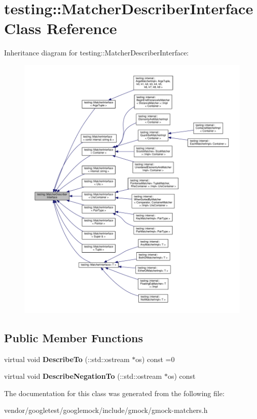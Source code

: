 \hypertarget{classtesting_1_1MatcherDescriberInterface}{}\section{testing\+:\+:Matcher\+Describer\+Interface Class Reference}
\label{classtesting_1_1MatcherDescriberInterface}


Inheritance diagram for testing\+:\+:Matcher\+Describer\+Interface\+:\nopagebreak
\begin{figure}[H]
\begin{center}
\leavevmode
\includegraphics[width=350pt]{classtesting_1_1MatcherDescriberInterface__inherit__graph}
\end{center}
\end{figure}
\subsection*{Public Member Functions}
\begin{DoxyCompactItemize}
\item 
virtual void {\bfseries Describe\+To} (\+::std\+::ostream $\ast$os) const =0\hypertarget{classtesting_1_1MatcherDescriberInterface_ad9f861588bd969b6e3e717f13bb94e7b}{}\label{classtesting_1_1MatcherDescriberInterface_ad9f861588bd969b6e3e717f13bb94e7b}

\item 
virtual void {\bfseries Describe\+Negation\+To} (\+::std\+::ostream $\ast$os) const \hypertarget{classtesting_1_1MatcherDescriberInterface_a35b9dc2f3e25ca4b903f282feaaf9f8c}{}\label{classtesting_1_1MatcherDescriberInterface_a35b9dc2f3e25ca4b903f282feaaf9f8c}

\end{DoxyCompactItemize}


The documentation for this class was generated from the following file\+:\begin{DoxyCompactItemize}
\item 
vendor/googletest/googlemock/include/gmock/gmock-\/matchers.\+h\end{DoxyCompactItemize}
